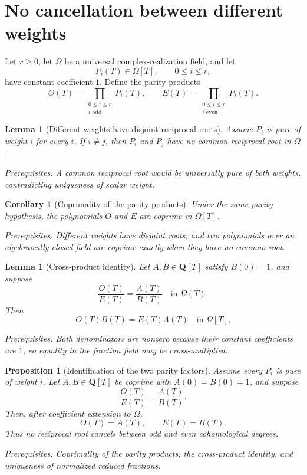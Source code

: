 \documentclass[10pt]{article}
\newtheorem{proposition}[theorem]{Proposition}
\newtheorem{corollary}[theorem]{Corollary}
\newtheorem{lemma}[theorem]{Lemma}
\theoremstyle{definition}
\newcommand{\deps}[1]{\par\smallskip\noindent\textit{Prerequisites.} #1}
\begin{document}
\section{No cancellation between different weights}

Let \(r\geq0\), let \(\Omega\) be a universal complex-realization field,
and let
\[
 P_i(T)\in\Omega[T],\qquad 0\leq i\leq r,
\]
have constant coefficient \(1\).  Define the parity products
\[
 O(T)=\prod_{\substack{0\leq i\leq r\\i\text{ odd}}}P_i(T),
 \qquad
 E(T)=\prod_{\substack{0\leq i\leq r\\i\text{ even}}}P_i(T).
\]

\begin{lemma}[Different weights have disjoint reciprocal roots]
Assume \(P_i\) is pure of weight \(i\) for every \(i\).  If \(i\neq j\),
then \(P_i\) and \(P_j\) have no common reciprocal root in \(\Omega\).
\deps{A common reciprocal root would be universally pure of both weights,
contradicting uniqueness of scalar weight.}
\end{lemma}

\begin{corollary}[Coprimality of the parity products]
Under the same purity hypothesis, the polynomials \(O\) and \(E\) are
coprime in \(\Omega[T]\).
\deps{Different weights have disjoint roots, and two polynomials over an
algebraically closed field are coprime exactly when they have no common
root.}
\end{corollary}

\begin{lemma}[Cross-product identity]
Let \(A,B\in\mathbf Q[T]\) satisfy \(B(0)=1\), and suppose
\[
 \frac{O(T)}{E(T)}=\frac{A(T)}{B(T)}
 \quad\text{in }\Omega(T).
\]
Then
\[
 O(T)B(T)=E(T)A(T)
 \quad\text{in }\Omega[T].
\]
\deps{Both denominators are nonzero because their constant coefficients are
\(1\), so equality in the fraction field may be cross-multiplied.}
\end{lemma}

\begin{proposition}[Identification of the two parity factors]
Assume every \(P_i\) is pure of weight \(i\).  Let
\(A,B\in\mathbf Q[T]\) be coprime with \(A(0)=B(0)=1\), and suppose
\[
 \frac{O(T)}{E(T)}=\frac{A(T)}{B(T)}.
\]
Then, after coefficient extension to \(\Omega\),
\[
 \boxed{O(T)=A(T),\qquad E(T)=B(T).}
\]
Thus no reciprocal root cancels between odd and even cohomological degrees.
\deps{Coprimality of the parity products, the cross-product identity, and
uniqueness of normalized reduced fractions.}
\end{proposition}
\end{document}
